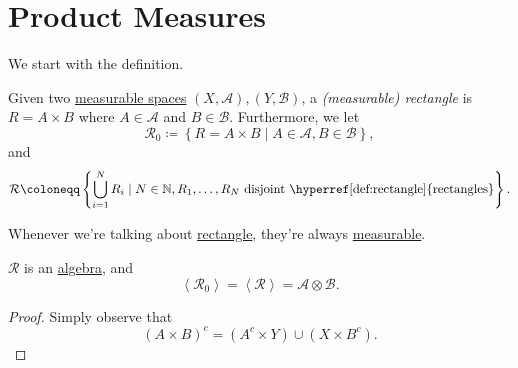 \section{Product Measures}
We start with the definition.
\begin{definition}[Rectangle]\label{def:rectangle}
	Given two \hyperref[def:measurable-space]{measurable spaces} \((X, \mathcal{A} ), (Y, \mathcal{B} )\),
	a \emph{(measurable) rectangle} is \(R = A\times B\) where \(A\in \mathcal{A} \)
	and \(B\in \mathcal{B} \). Furthermore, we let
	\[
		\mathcal{R} _0 \coloneqq \left\{R = A\times B \mid A\in \mathcal{A} , B\in \mathcal{B} \right\},
	\]
	and
	\[
		\mathcal{R} \coloneqq \left\{\bigcup_{i=1}^{N} R_{i} \mid N\in \mathbb{N} , R_1, \dots , R_N \text{ disjoint \hyperref[def:rectangle]{rectangles}}\right\}.
	\]
\end{definition}
\begin{note}
	Whenever we're talking about \hyperref[def:rectangle]{rectangle}, they're always \hyperref[def:measurable-set]{measurable}.
\end{note}

\begin{lemma}
	\(\mathcal{R} \) is an \hyperref[def:algebra]{algebra}, and
	\[
		\left< \mathcal{R} _0 \right> = \left< \mathcal{R}  \right> = \mathcal{A} \otimes \mathcal{B}.
	\]
\end{lemma}
\begin{proof}
	Simply observe that
	\[
		(A\times B)^{c} = (A^{c} \times Y)\cup (X\times B^{c} ).
	\]
\end{proof}